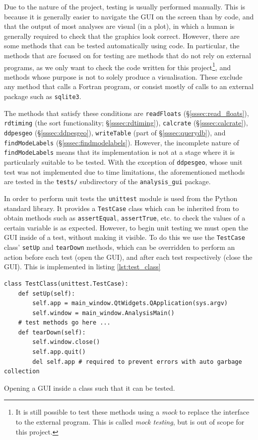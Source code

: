 \documentclass[12pt]{article}
\newenvironment{code}{\captionsetup{type=listing}}{\par\addvspace{\baselineskip}}
\begin{document}
Due to the nature of the project, testing is usually performed manually. This is because it is generally easier to navigate the GUI on the screen than by code, and that the output of most analyses are visual (in a plot), in which a human is generally required to check that the graphics look correct. However, there are some methods that can be tested automatically using code. In particular, the methods that are focused on for testing are methods that do not rely on external programs, as we only want to check the code written for this project\footnote{It is still possible to test these methods using a \textit{mock} to replace the interface to the external program. This is called \textit{mock testing}, but is out of scope for this project.}, and methods whose purpose is not to solely produce a visualisation. These exclude any method that calls a Fortran program, or consist mostly of calls to an external package such as \texttt{sqlite3}.

The methods that satisfy these conditions are \texttt{readFloats} (\S\ref{sssec:read_floats}), \texttt{rdtiming} (the sort functionality; \S\ref{sssec:rdtiming}), \texttt{calcrate} (\S\ref{sssec:calcrate}), \texttt{ddpesgeo} (\S\ref{sssec:ddpesgeo}), \texttt{writeTable} (part of \S\ref{sssec:querydb}), and \texttt{findModeLabels} (\S\ref{sssec:findmodelabels}). However, the incomplete nature of \texttt{findModeLabels} means that its implementation is not at a stage where it is particularly suitable to be tested. With the exception of \texttt{ddpesgeo}, whose unit test was not implemented due to time limitations, the aforementioned methods are tested in the \texttt{tests/} subdirectory of the \texttt{analysis\_gui} package.

In order to perform unit tests the \texttt{unittest} module is used from the Python standard library. It provides a \texttt{TestCase} class which can be inherited from to obtain methods such as \texttt{assertEqual}, \texttt{assertTrue}, etc. to check the values of a certain variable is as expected. However, to begin unit testing we must open the GUI inside of a test, without making it visible. To do this we use the \texttt{TestCase} class' \texttt{setUp} and \texttt{tearDown} methods, which can be overridden to perform an action before each test (open the GUI), and after each test respectively (close the GUI). This is implemented in listing \ref{lst:test_class}

\begin{code}\begin{verbatim}
class TestClass(unittest.TestCase):
    def setUp(self):
        self.app = main_window.QtWidgets.QApplication(sys.argv)
        self.window = main_window.AnalysisMain()
    # test methods go here ...
    def tearDown(self):
        self.window.close()
        self.app.quit()
        del self.app # required to prevent errors with auto garbage collection
\end{verbatim}
\caption{Opening a GUI inside a class such that it can be tested.}
\label{lst:test_class}
\end{code}
\end{document}
